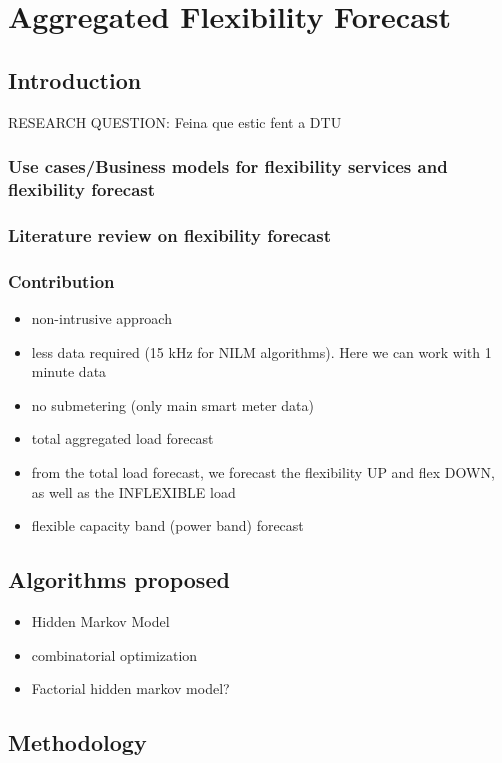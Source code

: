 \chapter{Aggregated Flexibility Forecast }
\label{ChapterAggFlexForecast}

\section{Introduction}
RESEARCH QUESTION: Feina que estic fent a DTU 
\subsection{Use cases/Business models for flexibility services and flexibility forecast}
\subsection{Literature review on flexibility forecast}
\subsection{Contribution}
\begin{itemize}
\item non-intrusive approach 
\item less data required (15 kHz for NILM algorithms). Here we can work with 1 minute data 
\item no submetering (only main smart meter data) 
\item total aggregated load forecast 
\item from the total load forecast, we forecast the flexibility UP and flex DOWN, as well as the INFLEXIBLE load 
\item flexible capacity band (power band) forecast
\end{itemize}

\section{Algorithms proposed}
\begin{itemize}
\item Hidden Markov Model 
\item combinatorial optimization
\item Factorial hidden markov model? 
\end{itemize}

\section{Methodology}
